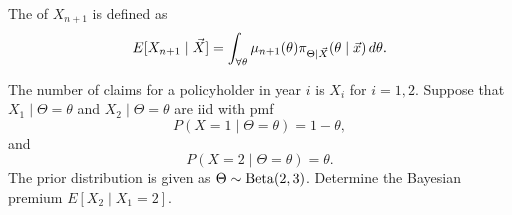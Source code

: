 \documentclass[notoc,notitlepage]{tufte-book}
\begin{document}
\begin{defn}\label{defn:bayesian_premium}
  The  of $X_{n+1}$ is defined as
  \begin{equation*}
    E[X_{n+1} \mid \vec{X}] = \int_{\forall \theta} \mu_{n+1}(\theta)
    \pi_{\Theta \mid \vec{X}}(\theta \mid \vec{x}) \mathop{}\!d{\theta}.
  \end{equation*}
\end{defn}

\begin{eg}
  The number of claims for a policyholder in year $i$ is $X_i$ for $i = 1, 2$.
  Suppose that $X_1 \mid \Theta = \theta$ and $X_2 \mid \Theta = \theta$ are iid
  with pmf
  \begin{equation*}
    P(X = 1 \mid \Theta = \theta) = 1 - \theta,
  \end{equation*}
  and
  \begin{equation*}
    P(X = 2 \mid \Theta = \theta) = \theta.
  \end{equation*}
  The prior distribution is given as $\Theta \sim \operatorname{Beta}(2, 3)$. Determine
  the Bayesian premium $E[X_2 \mid X_1 = 2]$.
\end{eg}
\end{document}
